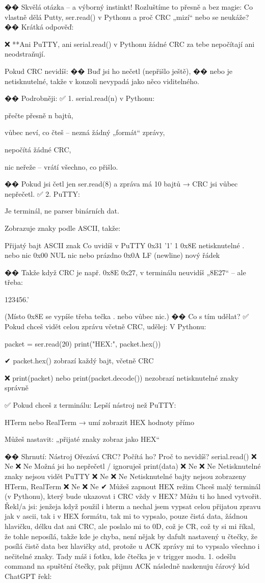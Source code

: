 �� Skvělá otázka – a výborný instinkt!
Rozluštíme to přesně a bez magie: Co vlastně dělá Putty, ser.read() v Pythonu a proč CRC „mizí“ nebo se neukáže?
�� Krátká odpověď:

    ❌ **Ani PuTTY, ani serial.read() v Pythonu žádné CRC za tebe nepočítají ani neodstraňují.

    Pokud CRC nevidíš: �� Buď jsi ho nečetl (nepřišlo ještě),
    �� nebo je netisknutelné, takže v konzoli nevypadá jako něco viditelného.

�� Podrobněji:
✅ 1. serial.read(n) v Pythonu:

    přečte přesně n bajtů,

    vůbec neví, co čteš – nezná žádný „formát“ zprávy,

    nepočítá žádné CRC,

    nic neřeže – vrátí všechno, co přišlo.

�� Pokud jsi četl jen ser.read(8) a zpráva má 10 bajtů → CRC jsi vůbec nepřečetl.
✅ 2. PuTTY:

    Je terminál, ne parser binárních dat.

    Zobrazuje znaky podle ASCII, takže:

Přijatý bajt	ASCII znak	Co uvidíš v PuTTY
0x31	'1'	1
0x8E	netisknutelné	. nebo nic
0x00	NUL	nic nebo prázdno
0x0A	LF (newline)	nový řádek

�� Takže když CRC je např. 0x8E 0x27, v terminálu neuvidíš „8E27“ – ale třeba:

123456.'

(Místo 0x8E se vypíše třeba tečka . nebo vůbec nic.)
�� Co s tím udělat?
✅ Pokud chceš vidět celou zprávu včetně CRC, udělej:
V Pythonu:

packet = ser.read(20)
print("HEX:", packet.hex())

    ✔ packet.hex() zobrazí každý bajt, včetně CRC

    ❌ print(packet) nebo print(packet.decode()) nezobrazí netisknutelné znaky správně

✅ Pokud chceš z terminálu:
Lepší nástroj než PuTTY:

    HTerm nebo RealTerm → umí zobrazit HEX hodnoty přímo

    Můžeš nastavit: „přijaté znaky zobraz jako HEX“

�� Shrnutí:
Nástroj	Ořezává CRC?	Počítá ho?	Proč to nevidíš?
serial.read()	❌ Ne	❌ Ne	Možná jsi ho nepřečetl / ignoruješ
print(data)	❌ Ne	❌ Ne	Netisknutelné znaky nejsou vidět
PuTTY	❌ Ne	❌ Ne	Netisknutelné bajty nejsou zobrazeny
HTerm, RealTerm	❌ Ne	❌ Ne	✔ Můžeš zapnout HEX režim
Chceš malý terminál (v Pythonu), který bude ukazovat i CRC vždy v HEX? Můžu ti ho hned vytvořit.
Řekl/a jsi:
jenžeja když použil i hterm a nechal jsem vypsat celou přijatou zpravu jak v ascii, tak i v HEX formátu, tak mi to vypsalo, pouze čistá data, žádnou hlavičku, délku dat ani CRC, ale poslalo mi to 0D, což je CR, což ty si mi říkal, že tohle neposílá, takže kde je chyba, není nějak by dafult nastavený u čtečky, že posílá čistě data bez hlavičky atd, protože u ACK zprávy mi to vypsalo všechno i nečitelné znaky. Tady máš i fotku, kde čtečka je v trigger modu. 1. odešlu command na spuštění čtečky, pak přijmu ACK následně naskenuju čárový kód
ChatGPT řekl:

